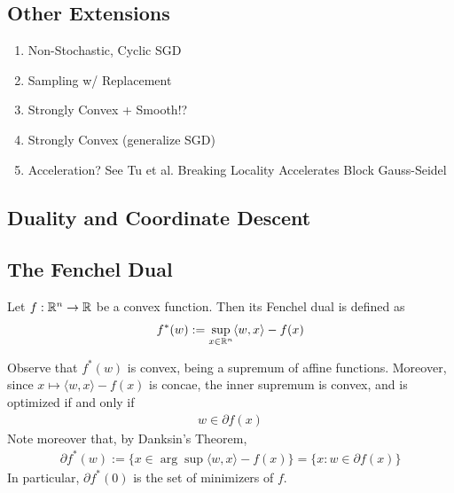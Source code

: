 	\subsection{Other Extensions}
	\begin{enumerate}
		\item Non-Stochastic, Cyclic SGD
		\item Sampling w/ Replacement
		\item Strongly Convex + Smooth!?
		\item Strongly Convex (generalize SGD)
		\item Acceleration? See Tu et al. Breaking Locality Accelerates Block Gauss-Seidel
	\end{enumerate}
	
\subsection{Duality and Coordinate Descent}
\subsection{The Fenchel Dual}
\begin{definition} Let $f: \mathbb{R}^n \to \mathbb{R}$ be a convex function. Then its Fenchel dual is defined as
\begin{eqnarray}
f^*(w) := \sup_{x \in \mathbb{R}^n} \langle w, x \rangle - f(x)
\end{eqnarray}
\end{definition}
Observe that $f^*(w)$ is convex, being a supremum of affine functions. Moreover, since $x \mapsto \langle w, x \rangle - f(x)$ is concae, the inner supremum is convex, and is optimized if and only if 
\begin{eqnarray}
w \in \partial f(x)
\end{eqnarray}
Note moreover that, by Danksin's Theorem, 
\begin{eqnarray}
\partial f^*(w) := \{x \in \arg\sup \langle w, x \rangle - f(x)\} = \{x: w \in \partial f(x)\}
\end{eqnarray}
In particular, $\partial f^*(0)$ is the set of minimizers of $f$. 
